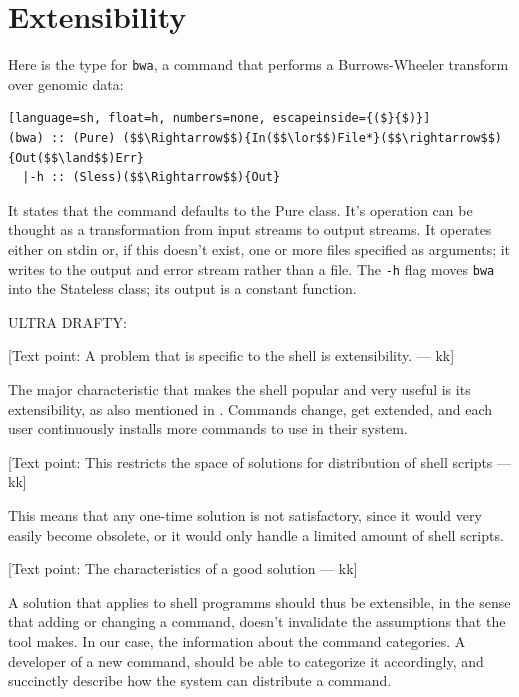 \documentclass[sigplan,10pt,review,anonymous]{acmart}
\newcommand{\ttt}[1]{\texttt{\small #1}}
\newcommand{\kk}[1]{[{\color{magenta}#1 --- kk}]}
\begin{document}
\section{Extensibility}
\label{ext}

Here is the type for \ttt{bwa}, a command that performs a Burrows-Wheeler transform over genomic data:
\begin{lstlisting}[language=sh, float=h, numbers=none, escapeinside={($}{$)}]
(bwa) :: (Pure) ($$\Rightarrow$$){In($$\lor$$)File*}($$\rightarrow$$){Out($$\land$$)Err}
  |-h :: (Sless)($$\Rightarrow$$){Out}                              
\end{lstlisting}

It states that the command defaults to the Pure class.
It's operation can be thought as a transformation from input streams to output streams.
It operates either on stdin or, if this doesn't exist, one or more files specified as arguments;
  it writes to the output and error stream rather than a file.
The \ttt{-h} flag moves \ttt{bwa} into the Stateless class;
  its output is a constant function.


ULTRA DRAFTY:

\kk{Text point: A problem that is specific to the shell is
  extensibility.}

The major characteristic that makes the shell popular and very useful
is its extensibility, as also mentioned in . Commands change,
get extended, and each user continuously installs more commands to use
in their system.

\kk{Text point: This restricts the space of solutions for distribution
  of shell scripts}

This means that any one-time solution is not satisfactory, since it
would very easily become obsolete, or it would only handle a limited
amount of shell scripts.

\kk{Text point: The characteristics of a good solution}

A solution that applies to shell programms should thus be extensible,
in the sense that adding or changing a command, doesn't invalidate the
assumptions that the tool makes. In our case, the information about
the command categories. A developer of a new command, should be able
to categorize it accordingly, and succinctly describe how the system
can distribute a command.
\end{document}
